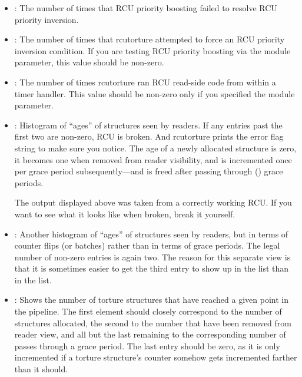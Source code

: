 \begin{itemize}
\item	{}: The number of times that RCU priority boosting failed
	to resolve RCU priority inversion.

\item	{}: The number of times that rcutorture attempted to force
	an RCU priority inversion condition.
	If you are testing RCU
	priority boosting via the  module parameter, this
	value should be non-zero.

\item	{}: The number of times rcutorture ran RCU read-side code from
	within a timer handler.
	This value should be non-zero only
	if you specified the  module parameter.

\item	{}: Histogram of ``ages'' of structures seen by readers.
	If any entries past the first two are non-zero, RCU is broken.
	And rcutorture prints the error flag string \qco{!!!} to make sure
	you notice.
	The age of a newly allocated structure is zero,
	it becomes one when removed from reader visibility, and is
	incremented once per grace period subsequently---and is freed
	after passing through () grace periods.

	The output displayed above was taken from a correctly working
	RCU\@.
	If you want to see what it looks like when broken, break
	it yourself.%

\item	{}: Another histogram of ``ages'' of structures seen
	by readers, but in terms of counter flips (or batches) rather
	than in terms of grace periods.
	The legal number of non-zero
	entries is again two.
	The reason for this separate view is that
	it is sometimes easier to get the third entry to show up in the
	 list than in the  list.

\item	{}: Shows the number of torture structures
	that have reached a given point in the pipeline.
	The first element
	should closely correspond to the number of structures allocated,
	the second to the number that have been removed from reader view,
	and all but the last remaining to the corresponding number of
	passes through a grace period.
	The last entry should be zero,
	as it is only incremented if a torture structure's counter
	somehow gets incremented farther than it should.
\end{itemize}

